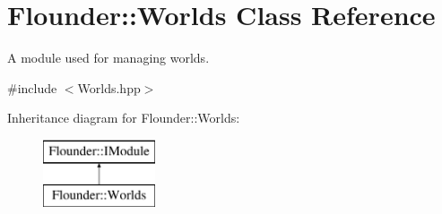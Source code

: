 \hypertarget{class_flounder_1_1_worlds}{}\section{Flounder\+:\+:Worlds Class Reference}
\label{class_flounder_1_1_worlds}


A module used for managing worlds.  




{\ttfamily \#include $<$Worlds.\+hpp$>$}

Inheritance diagram for Flounder\+:\+:Worlds\+:\begin{figure}[H]
\begin{center}
\leavevmode
\includegraphics[height=2.000000cm]{class_flounder_1_1_worlds}
\end{center}
\end{figure}
